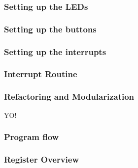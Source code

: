     \subsubsection{Setting up the LEDs}
        
        

    \subsubsection{Setting up the buttons}

        

    \subsubsection{Setting up the interrupts}

        

    \subsubsection{Interrupt Routine}
        

    \subsubsection{Refactoring and Modularization}

        YO!

    \subsubsection{Program flow}

        

    \subsubsection{Register Overview}

        


